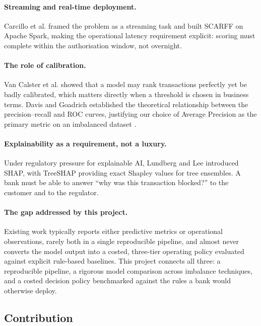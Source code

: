 \paragraph*{Streaming and real-time deployment.}
Carcillo et al. \cite{Carcillo2018} framed the problem as a streaming task and
built SCARFF on Apache Spark, making the operational latency requirement
explicit: scoring must complete within the authorisation window, not overnight.

\paragraph*{The role of calibration.}
Van Calster et al. \cite{VanCalster2019} showed that a model may rank
transactions perfectly yet be badly calibrated, which matters directly when a
threshold is chosen in business terms. Davis and Goadrich \cite{Davis2006}
established the theoretical relationship between the precision--recall and ROC
curves, justifying our choice of Average Precision as the primary metric on an
imbalanced dataset \cite{Fawcett2006}.

\paragraph*{Explainability as a requirement, not a luxury.}
Under regulatory pressure for explainable AI, Lundberg and Lee \cite{Lundberg2017}
introduced SHAP, with TreeSHAP \cite{Lundberg2020} providing exact Shapley
values for tree ensembles. A bank must be able to answer ``why was this
transaction blocked?'' to the customer and to the regulator.

\paragraph*{The gap addressed by this project.}
Existing work typically reports either predictive metrics or operational
observations, rarely both in a single reproducible pipeline, and almost never
converts the model output into a costed, three-tier operating policy evaluated
against explicit rule-based baselines. This project connects all three: a
reproducible pipeline, a rigorous model comparison across imbalance techniques,
and a costed decision policy benchmarked against the rules a bank would
otherwise deploy.

\subsection{Contribution}

